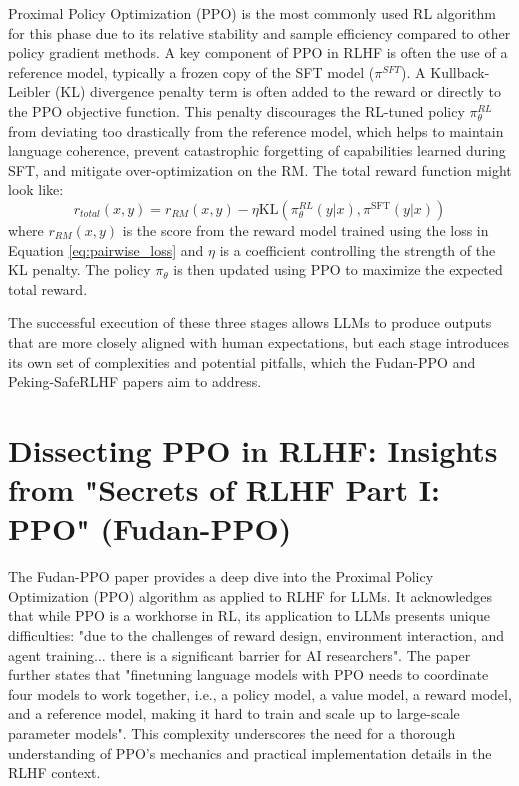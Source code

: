 \documentclass{article}
\begin{document}
Proximal Policy Optimization (PPO) \cite{Zheng2023PPO, Dai2023SafeRLHF} is the most commonly used RL algorithm for this phase due to its relative stability and sample efficiency compared to other policy gradient methods. A key component of PPO in RLHF is often the use of a reference model, typically a frozen copy of the SFT model ($\pi^{SFT}$). A Kullback-Leibler (KL) divergence penalty term is often added to the reward or directly to the PPO objective function. This penalty discourages the RL-tuned policy $\pi_\theta^{RL}$ from deviating too drastically from the reference model, which helps to maintain language coherence, prevent catastrophic forgetting of capabilities learned during SFT, and mitigate over-optimization on the RM. \cite{Zheng2023PPO} The total reward function might look like:
\begin{equation}
    \label{eq:total_reward}
    r_{total}(x,y) = r_{RM}(x,y) - \eta \text{KL}(\pi_\theta^{RL}(y|x), \pi^{\text{SFT}}(y|x))
\end{equation}
where $r_{RM}(x,y)$ is the score from the reward model trained using the loss in Equation \ref{eq:pairwise_loss} and $\eta$ is a coefficient controlling the strength of the KL penalty. The policy $\pi_\theta$ is then updated using PPO to maximize the expected total reward.

The successful execution of these three stages allows LLMs to produce outputs that are more closely aligned with human expectations, but each stage introduces its own set of complexities and potential pitfalls, which the Fudan-PPO and Peking-SafeRLHF papers aim to address.

\section{Dissecting PPO in RLHF: Insights from "Secrets of RLHF Part I: PPO" (Fudan-PPO)}
\label{sec:fudan_ppo}

The Fudan-PPO paper \cite{Zheng2023PPO} provides a deep dive into the Proximal Policy Optimization (PPO) algorithm as applied to RLHF for LLMs. It acknowledges that while PPO is a workhorse in RL, its application to LLMs presents unique difficulties: "due to the challenges of reward design, environment interaction, and agent training... there is a significant barrier for AI researchers". \cite{Zheng2023PPO} The paper further states that "finetuning language models with PPO needs to coordinate four models to work together, i.e., a policy model, a value model, a reward model, and a reference model, making it hard to train and scale up to large-scale parameter models". \cite{Zheng2023PPO} This complexity underscores the need for a thorough understanding of PPO's mechanics and practical implementation details in the RLHF context.
\end{document}
